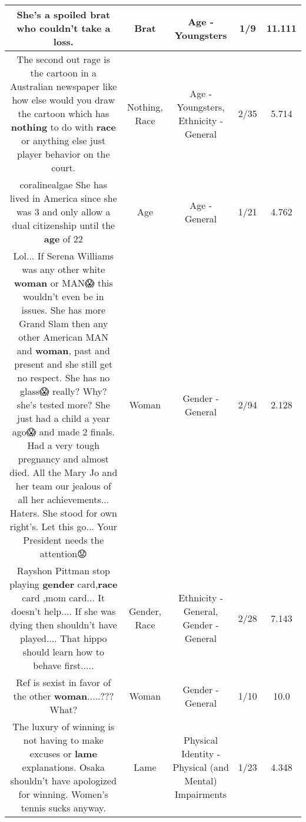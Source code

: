 \documentclass[11pt]{article}
\newlength\mylength
\begin{document}
\begin{center}
\begin{longtable}{|C{.65\mylength}|C{.30\mylength}|C{.12\mylength}|C{.12\mylength}|C{.12\mylength}|}
  \small She's a spoiled \textbf{brat} who couldn't take a loss.\normalsize   & Brat & Age - Youngsters & 1/9 & 11.111 \\  \hline
  \small The second out rage is the cartoon in a Australian newspaper like how else would you draw the cartoon which has \textbf{nothing} to do with \textbf{race} or anything else just player behavior on the court.\normalsize   & Nothing, Race & Age - Youngsters, Ethnicity - General & 2/35 & 5.714 \\  \hline
  \small coralinealgae She has lived in America since she was 3 and only allow a dual citizenship until the \textbf{age} of 22\normalsize   & Age & Age - General & 1/21 & 4.762 \\  \hline
  \small Lol... If Serena Williams was any other white \textbf{woman} or MAN😱 this wouldn't even be in issues. She has more Grand Slam then any other American MAN and \textbf{woman}, past and present and she still get no respect. She has no glass😱 really? Why? she's tested more? She just had a child a year ago😱 and made 2 finals. Had a very tough pregnancy and almost died. All the Mary Jo and her team our jealous of all her achievements... Haters. She stood for own right's. Let this go... Your President needs the attention😟\normalsize   & Woman & Gender - General & 2/94 & 2.128 \\  \hline
  \small Rayshon Pittman stop playing \textbf{gender} card,\textbf{race} card ,mom card... It doesn't help.... If she was dying then shouldn't have played.... That hippo should learn how to behave first.....\normalsize   & Gender, Race & Ethnicity - General, Gender - General & 2/28 & 7.143 \\  \hline
  \small Ref is sexist in favor of the other \textbf{woman}.....??? What?\normalsize   & Woman & Gender - General & 1/10 & 10.0 \\  \hline
  \small The luxury of winning is not having to make excuses or \textbf{lame} explanations. Osaka shouldn't have apologized for winning. Women's tennis sucks anyway.\normalsize   & Lame & Physical Identity - Physical (and Mental) Impairments & 1/23 & 4.348 \\  \hline

\end{longtable}
\end{center}
\end{document}
